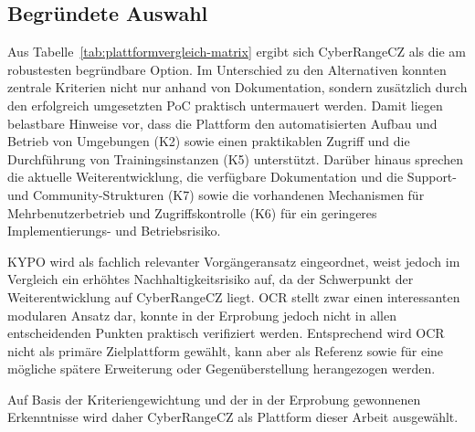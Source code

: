 \subsection{Begründete Auswahl}
\label{subsec:auswahl}

Aus Tabelle~\ref{tab:plattformvergleich-matrix} ergibt sich CyberRangeCZ als die am robustesten
begründbare Option. Im Unterschied zu den Alternativen konnten zentrale Kriterien nicht nur anhand
von Dokumentation, sondern zusätzlich durch den erfolgreich umgesetzten PoC praktisch untermauert
werden. Damit liegen belastbare Hinweise vor, dass die Plattform den automatisierten Aufbau und
Betrieb von Umgebungen (K2) sowie einen praktikablen Zugriff und die Durchführung von
Trainingsinstanzen (K5) unterstützt. Darüber hinaus sprechen die aktuelle Weiterentwicklung, die
verfügbare Dokumentation und die Support- und Community-Strukturen (K7) sowie die vorhandenen
Mechanismen für Mehrbenutzerbetrieb und Zugriffskontrolle (K6) für ein geringeres Implementierungs-
und Betriebsrisiko.

KYPO wird als fachlich relevanter Vorgängeransatz eingeordnet, weist jedoch im Vergleich ein
erhöhtes Nachhaltigkeitsrisiko auf, da der Schwerpunkt der Weiterentwicklung auf CyberRangeCZ liegt.
OCR stellt zwar einen interessanten modularen Ansatz dar, konnte in der Erprobung jedoch nicht in
allen entscheidenden Punkten praktisch verifiziert werden. Entsprechend wird OCR nicht als primäre
Zielplattform gewählt, kann aber als Referenz sowie für eine mögliche spätere Erweiterung oder
Gegenüberstellung herangezogen werden.

Auf Basis der Kriteriengewichtung und der in der Erprobung gewonnenen Erkenntnisse wird daher
CyberRangeCZ als Plattform dieser Arbeit ausgewählt.
